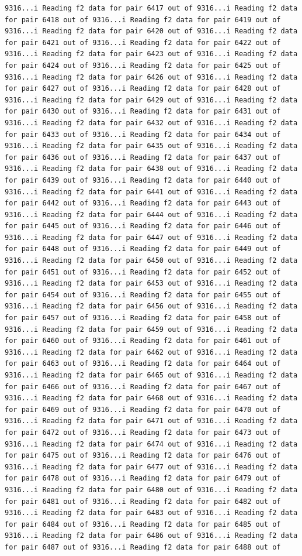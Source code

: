 \documentclass[
]{article}
\begin{document}
\begin{verbatim}
9316...i Reading f2 data for pair 6417 out of 9316...i Reading f2 data for pair 6418 out of 9316...i Reading f2 data for pair 6419 out of 9316...i Reading f2 data for pair 6420 out of 9316...i Reading f2 data for pair 6421 out of 9316...i Reading f2 data for pair 6422 out of 9316...i Reading f2 data for pair 6423 out of 9316...i Reading f2 data for pair 6424 out of 9316...i Reading f2 data for pair 6425 out of 9316...i Reading f2 data for pair 6426 out of 9316...i Reading f2 data for pair 6427 out of 9316...i Reading f2 data for pair 6428 out of 9316...i Reading f2 data for pair 6429 out of 9316...i Reading f2 data for pair 6430 out of 9316...i Reading f2 data for pair 6431 out of 9316...i Reading f2 data for pair 6432 out of 9316...i Reading f2 data for pair 6433 out of 9316...i Reading f2 data for pair 6434 out of 9316...i Reading f2 data for pair 6435 out of 9316...i Reading f2 data for pair 6436 out of 9316...i Reading f2 data for pair 6437 out of 9316...i Reading f2 data for pair 6438 out of 9316...i Reading f2 data for pair 6439 out of 9316...i Reading f2 data for pair 6440 out of 9316...i Reading f2 data for pair 6441 out of 9316...i Reading f2 data for pair 6442 out of 9316...i Reading f2 data for pair 6443 out of 9316...i Reading f2 data for pair 6444 out of 9316...i Reading f2 data for pair 6445 out of 9316...i Reading f2 data for pair 6446 out of 9316...i Reading f2 data for pair 6447 out of 9316...i Reading f2 data for pair 6448 out of 9316...i Reading f2 data for pair 6449 out of 9316...i Reading f2 data for pair 6450 out of 9316...i Reading f2 data for pair 6451 out of 9316...i Reading f2 data for pair 6452 out of 9316...i Reading f2 data for pair 6453 out of 9316...i Reading f2 data for pair 6454 out of 9316...i Reading f2 data for pair 6455 out of 9316...i Reading f2 data for pair 6456 out of 9316...i Reading f2 data for pair 6457 out of 9316...i Reading f2 data for pair 6458 out of 9316...i Reading f2 data for pair 6459 out of 9316...i Reading f2 data for pair 6460 out of 9316...i Reading f2 data for pair 6461 out of 9316...i Reading f2 data for pair 6462 out of 9316...i Reading f2 data for pair 6463 out of 9316...i Reading f2 data for pair 6464 out of 9316...i Reading f2 data for pair 6465 out of 9316...i Reading f2 data for pair 6466 out of 9316...i Reading f2 data for pair 6467 out of 9316...i Reading f2 data for pair 6468 out of 9316...i Reading f2 data for pair 6469 out of 9316...i Reading f2 data for pair 6470 out of 9316...i Reading f2 data for pair 6471 out of 9316...i Reading f2 data for pair 6472 out of 9316...i Reading f2 data for pair 6473 out of 9316...i Reading f2 data for pair 6474 out of 9316...i Reading f2 data for pair 6475 out of 9316...i Reading f2 data for pair 6476 out of 9316...i Reading f2 data for pair 6477 out of 9316...i Reading f2 data for pair 6478 out of 9316...i Reading f2 data for pair 6479 out of 9316...i Reading f2 data for pair 6480 out of 9316...i Reading f2 data for pair 6481 out of 9316...i Reading f2 data for pair 6482 out of 9316...i Reading f2 data for pair 6483 out of 9316...i Reading f2 data for pair 6484 out of 9316...i Reading f2 data for pair 6485 out of 9316...i Reading f2 data for pair 6486 out of 9316...i Reading f2 data for pair 6487 out of 9316...i Reading f2 data for pair 6488 out of 
\end{verbatim}
\end{document}
